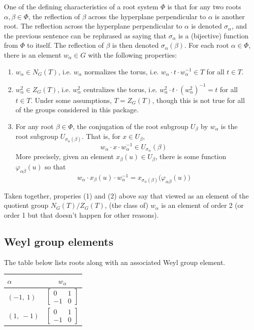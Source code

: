 \documentclass[11pt]{article}
\newcommand{\noi}{\noindent}
\newcommand{\inv}{^{-1}}
\newcommand{\sig}{\sigma}
\theoremstyle{definition}
\begin{document}
One of the defining characteristics of a root system $\Phi$ is that for any two roots $\alpha, \beta \in \Phi$, the reflection of $\beta$ across the hyperplane perpendicular to $\alpha$ is another root. The reflection across the hyperplane perpendicular to $\alpha$ is denoted $\sig_\alpha$, and the previous sentence can be rephrased as saying that $\sig_\alpha$ is a (bijective) function from $\Phi$ to itself. The reflection of $\beta$ is then denoted $\sig_\alpha(\beta)$. For each root $\alpha \in \Phi$, there is an element $w_\alpha \in G$ with the following properties:
\begin{enumerate}
	\item $w_\alpha \in N_G(T)$, i.e. $w_\alpha$ normalizes the torus, i.e. $w_\alpha \cdot t \cdot w_\alpha \inv \in T$ for all $t \in T$.
	\item $w_\alpha^2 \in Z_G(T)$, i.e. $w_\alpha^2$ centralizes the torus, i.e. $w_\alpha^2 \cdot t \cdot (w_\alpha^2) \inv = t$ for all $t \in T$. Under some assumptions, $T = Z_G(T)$, though this is not true for all of the groups considered in this package.
	\item For any root $\beta \in \Phi$, the conjugation of the root subgroup $U_\beta$ by $w_\alpha$ is the root subgroup $U_{\sig_\alpha(\beta)}$. That is, for $x \in U_\beta$,
	\[
		w_\alpha \cdot x \cdot w_\alpha \inv \in U_{\sig_{\alpha}}(\beta)
	\]
	More precisely, given an element $x_\beta(u) \in U_\beta$, there is some function $\varphi_{\alpha \beta}(u)$ so that
	\[
		w_\alpha \cdot x_\beta(u) \cdot w_\alpha \inv = x_{\sig_{\alpha}(\beta)} \Big( \varphi_{\alpha \beta}(u) \Big)
	\]
\end{enumerate}
Taken together, properies (1) and (2) above say that viewed as an element of the quotient group $N_G(T)/Z_G(T)$, (the class of) $w_\alpha$ is an element of order 2 (or order 1 but that doesn't happen for other reasons).

\subsection{Weyl group elements}

\noi The table below lists roots along with an associated Weyl group element.

\bigskip

\noi \noindent \begin{longtable}{|l|c|}
    \hline
    $\alpha$ & $w_\alpha$ \\
    \hline
    \endhead
    $\left( -1, \  1\right)$ & ${\left[\begin{matrix}0 & 1\\-1 & 0\end{matrix}\right]}$ \\
    \hline
    $\left( 1, \  -1\right)$ & ${\left[\begin{matrix}0 & 1\\-1 & 0\end{matrix}\right]}$ \\
    \hline
\end{longtable}
\end{document}
